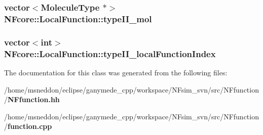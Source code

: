 \subsubsection{\setlength{\rightskip}{0pt plus 5cm}vector$<${\bf MoleculeType} $\ast$$>$ {\bf NFcore::LocalFunction::typeII\_\-mol}\hspace{0.3cm}{\tt  [protected]}}\label{classNFcore_1_1LocalFunction_a955096ada326b36d188ca3743470a09}


\subsubsection{\setlength{\rightskip}{0pt plus 5cm}vector$<$int$>$ {\bf NFcore::LocalFunction::typeII\_\-localFunctionIndex}\hspace{0.3cm}{\tt  [protected]}}\label{classNFcore_1_1LocalFunction_90a0774ef85096dbdd99ccabcc045553}




The documentation for this class was generated from the following files:\begin{CompactItemize}
\item 
/home/msneddon/eclipse/ganymede\_\-cpp/workspace/NFsim\_\-svn/src/NFfunction/{\bf NFfunction.hh}\item 
/home/msneddon/eclipse/ganymede\_\-cpp/workspace/NFsim\_\-svn/src/NFfunction/{\bf function.cpp}\end{CompactItemize}
